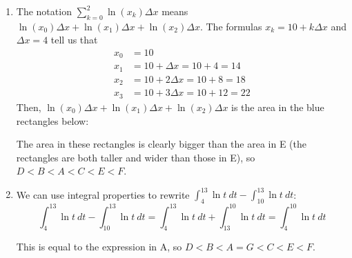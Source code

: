 \documentclass{article}
\begin{document}
\begin{enumerate}
\begin{solution}
\begin{enumerate}[label=\Alph*.]
    \item The notation $\displaystyle \sum_{k=0}^2 \ln (x_k) \Delta x$
      means $\ln(x_0) \Delta x + \ln (x_1) \Delta x + \ln(x_2) \Delta x$.
      The formulas $x_k = 10 +
      k \Delta x$ and $\Delta x = 4$ tell us that
      \begin{align*}
        x_0 &= 10 \\
        x_1 &= 10 + \Delta x = 10 + 4 = 14 \\
        x_2 &= 10 + 2 \Delta x = 10 + 8 = 18 \\
        x_3 &= 10 + 3 \Delta x = 10 + 12 = 22
      \end{align*}
      Then, $\ln(x_0) \Delta x + \ln (x_1) \Delta x + \ln(x_2) \Delta x$
      is the area in the blue rectangles below:
      \begin{center}
      \end{center}
      The area in these rectangles is clearly bigger than the area in E
      (the rectangles are both taller and wider than those in E),
      so $D < B < A < C < E < F$.

      \item We can use integral properties to rewrite $\displaystyle\int_4^{13} \ln t \ dt - \displaystyle\int_{10}^{13} \ln t \ dt$:
      \[\displaystyle\int_4^{13} \ln t \ dt - \displaystyle\int_{10}^{13} \ln t \ dt = \displaystyle\int_4^{13} \ln t \ dt + \displaystyle\int_{13}^{10} \ln t \ dt = \displaystyle\int_4^{10} \ln t \ dt\]

      This is equal to the expression in A, so $D < B < A =G < C < E  < F$.


\end{enumerate}
\end{solution}
\end{enumerate}
\end{document}
